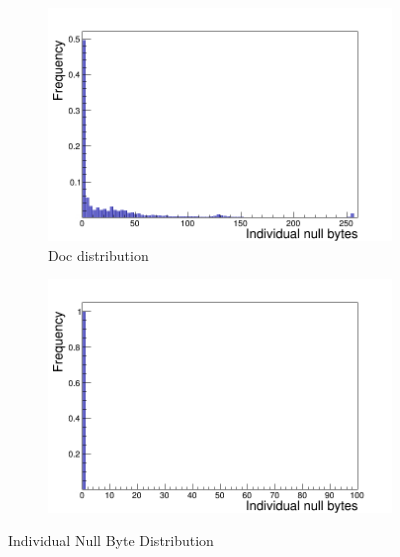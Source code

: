\begin{figure}[!ht]
   \begin{subfigure}[b]{.5\linewidth}
    \raggedleft
     \includegraphics[scale=0.36]{figures/null_bytes/Indi_Null_Bytes_doc}
   \caption{Doc distribution}
    \label{fig:1c}
  \end{subfigure}%
  \begin{subfigure}[b]{.5\linewidth}
    \raggedright
        \includegraphics[scale=0.36]{figures/null_bytes/Indi_Null_Bytes_text}
    \label{fig:1d}
  \end{subfigure}
  
  
  \caption{Individual Null Byte Distribution}
  \label{fig:null_bytes}
  
\end{figure}